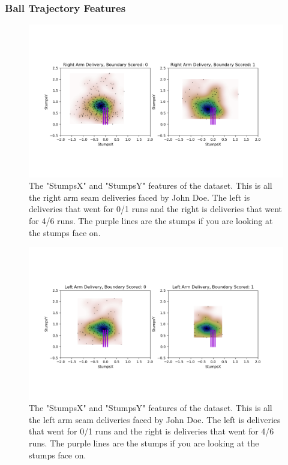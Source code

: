 \documentclass[12pt,a4paper]{report}
\theoremstyle{definition}
\begin{document}
\subsubsection{Ball Trajectory Features}

\begin{figure}
    \centering
    \includegraphics[width=\linewidth]{post_wicket_right_arm.png}
    \caption{The "StumpsX" and "StumpsY" features of the dataset. This is all the right arm seam deliveries faced by John Doe. The left is deliveries that went for 0/1 runs and the right is deliveries that went for 4/6 runs. The purple lines are the stumps if you are looking at the stumps face on.}
    \label{fig:StumpsXY}
\end{figure}

\begin{figure}
    \centering
    \includegraphics[width=\linewidth]{post_wicket_left_arm.png}
    \caption{The "StumpsX" and "StumpsY" features of the dataset. This is all the left arm seam deliveries faced by John Doe. The left is deliveries that went for 0/1 runs and the right is deliveries that went for 4/6 runs. The purple lines are the stumps if you are looking at the stumps face on.}
    \label{fig:StumpsXY}
\end{figure}
\end{document}
